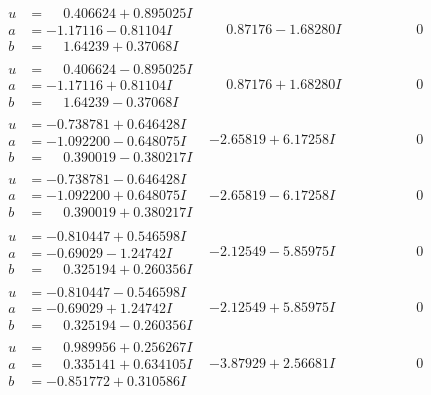 \documentclass[1p]{elsarticle_modified}
\theoremstyle{definition}
\begin{document}
$$\begin{array}{c|c|c}
\begin{aligned}
u &= \phantom{-}0.406624 + 0.895025 I \\
a &= -1.17116 - 0.81104 I \\
b &= \phantom{-}1.64239 + 0.37068 I\end{aligned}
 & \phantom{-}0.87176 - 1.68280 I & \phantom{-0.000000 } 0 \\ \hline\begin{aligned}
u &= \phantom{-}0.406624 - 0.895025 I \\
a &= -1.17116 + 0.81104 I \\
b &= \phantom{-}1.64239 - 0.37068 I\end{aligned}
 & \phantom{-}0.87176 + 1.68280 I & \phantom{-0.000000 } 0 \\ \hline\begin{aligned}
u &= -0.738781 + 0.646428 I \\
a &= -1.092200 - 0.648075 I \\
b &= \phantom{-}0.390019 - 0.380217 I\end{aligned}
 & -2.65819 + 6.17258 I & \phantom{-0.000000 } 0 \\ \hline\begin{aligned}
u &= -0.738781 - 0.646428 I \\
a &= -1.092200 + 0.648075 I \\
b &= \phantom{-}0.390019 + 0.380217 I\end{aligned}
 & -2.65819 - 6.17258 I & \phantom{-0.000000 } 0 \\ \hline\begin{aligned}
u &= -0.810447 + 0.546598 I \\
a &= -0.69029 - 1.24742 I \\
b &= \phantom{-}0.325194 + 0.260356 I\end{aligned}
 & -2.12549 - 5.85975 I & \phantom{-0.000000 } 0 \\ \hline\begin{aligned}
u &= -0.810447 - 0.546598 I \\
a &= -0.69029 + 1.24742 I \\
b &= \phantom{-}0.325194 - 0.260356 I\end{aligned}
 & -2.12549 + 5.85975 I & \phantom{-0.000000 } 0 \\ \hline\begin{aligned}
u &= \phantom{-}0.989956 + 0.256267 I \\
a &= \phantom{-}0.335141 + 0.634105 I \\
b &= -0.851772 + 0.310586 I\end{aligned}
 & -3.87929 + 2.56681 I & \phantom{-0.000000 } 0 \\ \hline\begin{aligned}

\end{aligned}
\end{array}$$
\end{document}
